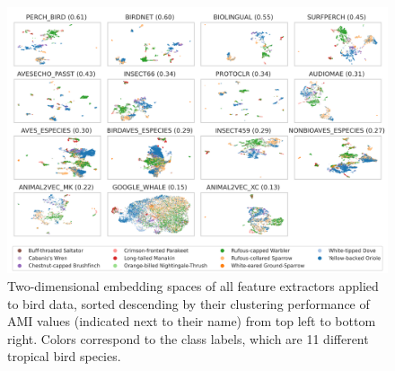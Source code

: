 \begin{figure}[ht]
    \centerline{{
    \includegraphics[width=16.3cm]{Sections/imgs/normal_overview.png}}}
    \caption{Two-dimensional embedding spaces of all feature extractors applied to bird data, sorted descending by their clustering performance of AMI values (indicated next to their name) from top left to bottom right.
    Colors correspond to the class labels, which are 11 different tropical bird species.}
    \label{fig:embeds}
\end{figure}